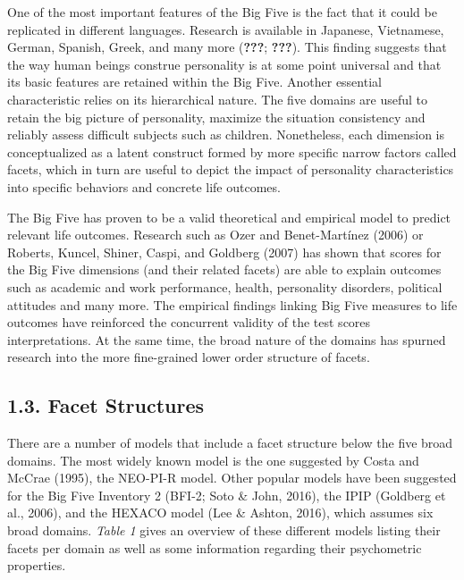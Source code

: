 \documentclass[,man,floatsintext]{apa6}
\theoremstyle{definition}
\theoremstyle{definition}
\theoremstyle{definition}
\theoremstyle{remark}
\begin{document}
One of the most important features of the Big Five is the fact that it
could be replicated in different languages. Research is available in
Japanese, Vietnamese, German, Spanish, Greek, and many more
({\textbf{???}}; {\textbf{???}}). This finding suggests that the way
human beings construe personality is at some point universal and that
its basic features are retained within the Big Five. Another essential
characteristic relies on its hierarchical nature. The five domains are
useful to retain the big picture of personality, maximize the situation
consistency and reliably assess difficult subjects such as children.
Nonetheless, each dimension is conceptualized as a latent construct
formed by more specific narrow factors called facets, which in turn are
useful to depict the impact of personality characteristics into specific
behaviors and concrete life outcomes.

The Big Five has proven to be a valid theoretical and empirical model to
predict relevant life outcomes. Research such as Ozer and Benet-Martínez
(2006) or Roberts, Kuncel, Shiner, Caspi, and Goldberg (2007) has shown
that scores for the Big Five dimensions (and their related facets) are
able to explain outcomes such as academic and work performance, health,
personality disorders, political attitudes and many more. The empirical
findings linking Big Five measures to life outcomes have reinforced the
concurrent validity of the test scores interpretations. At the same
time, the broad nature of the domains has spurned research into the more
fine-grained lower order structure of facets.

\hypertarget{facet-structures}{%
\subsection{1.3. Facet Structures}\label{facet-structures}}

There are a number of models that include a facet structure below the
five broad domains. The most widely known model is the one suggested by
Costa and McCrae (1995), the NEO-PI-R model. Other popular models have
been suggested for the Big Five Inventory 2 (BFI-2; Soto \& John, 2016),
the IPIP (Goldberg et al., 2006), and the HEXACO model (Lee \& Ashton,
2016), which assumes six broad domains. \emph{Table 1} gives an overview
of these different models listing their facets per domain as well as
some information regarding their psychometric properties.

\vspace{5mm}
\end{document}
